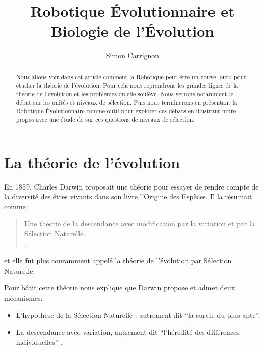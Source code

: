 \documentclass[a4paper,10pt]{article}
\title{Robotique Évolutionnaire et Biologie de l'Évolution}
\author{Simon Carrignon}
\begin{document}
\maketitle

\begin{abstract}
	Nous allons voir dans cet article comment la Robotique peut être un nouvel outil pour étudier la théorie de l'évolution. Pour cela nous reprendrons les grandes lignes de la théorie de l'évolution et les problèmes qu'elle soulève. Nous verrons notamment le débat sur les unités et niveaux de sélection. Puis nous terminerons en présentant la Robotique \'Evolutionnaire comme outil pour explorer ces débats en illustrant notre propos avec une étude de \cite{waibel09geneticteamcompositionlevelselectionevolutioncooperation} sur ces questions de niveaux de sélection.
\end{abstract}

\section{La théorie de l'évolution}\label{sec:TE}
En 1859, Charles Darwin proposait une théorie pour essayer de rendre compte de la diversité des êtres vivants dans son livre l'Origine des Espèces\nocite{darwin1859originspeciesbymeansnaturalselectionorpreservationfavouredracesstrugglelife}. Il la résumait comme:
\begin{quote}
	Une théorie de la descendance avec modification par la variation et par la Sélection Naturelle.\\
	\cite[dernière édition, trad. \cite{gayon1991darwinetlapresdarwin}]{darwin1859originspeciesbymeansnaturalselectionorpreservationfavouredracesstrugglelife}.
\end{quote}
et elle fut plus couramment appelé la théorie de l'évolution par Sélection Naturelle.

Pour bâtir cette théorie \cite{gayon1991darwinetlapresdarwin} nous explique que Darwin propose et admet deux mécanismes:
\begin{itemize}
	\item L'hypothèse de la Sélection Naturelle : autrement dit ``la survie du plus apte''. %
	\item La descendance avec variation, autrement dit ``l'hérédité des différences individuelles'' \citep{gayon1991darwinetlapresdarwin}.
\end{itemize}
\end{document}
